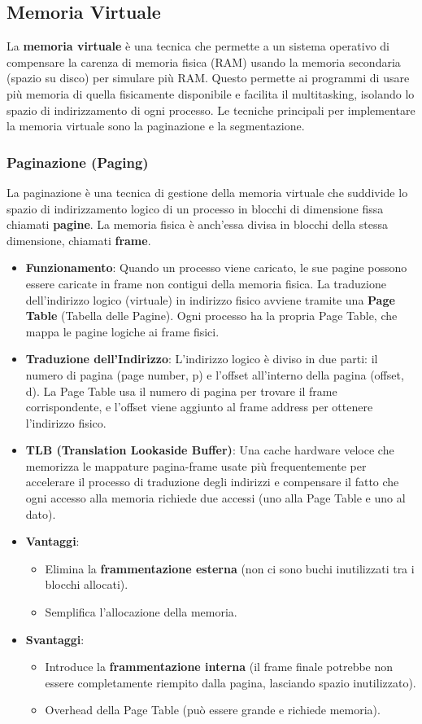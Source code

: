\subsection{Memoria Virtuale}
La \textbf{memoria virtuale} è una tecnica che permette a un sistema operativo di compensare la carenza di memoria fisica (RAM) usando la memoria secondaria (spazio su disco) per simulare più RAM. Questo permette ai programmi di usare più memoria di quella fisicamente disponibile e facilita il multitasking, isolando lo spazio di indirizzamento di ogni processo. Le tecniche principali per implementare la memoria virtuale sono la paginazione e la segmentazione.

\subsubsection{Paginazione (Paging)}
La paginazione è una tecnica di gestione della memoria virtuale che suddivide lo spazio di indirizzamento logico di un processo in blocchi di dimensione fissa chiamati \textbf{pagine}. La memoria fisica è anch'essa divisa in blocchi della stessa dimensione, chiamati \textbf{frame}.
\begin{itemize}
    \item \textbf{Funzionamento}: Quando un processo viene caricato, le sue pagine possono essere caricate in frame non contigui della memoria fisica. La traduzione dell'indirizzo logico (virtuale) in indirizzo fisico avviene tramite una \textbf{Page Table} (Tabella delle Pagine). Ogni processo ha la propria Page Table, che mappa le pagine logiche ai frame fisici.
    \item \textbf{Traduzione dell'Indirizzo}: L'indirizzo logico è diviso in due parti: il numero di pagina (page number, p) e l'offset all'interno della pagina (offset, d). La Page Table usa il numero di pagina per trovare il frame corrispondente, e l'offset viene aggiunto al frame address per ottenere l'indirizzo fisico.
    \item \textbf{TLB (Translation Lookaside Buffer)}: Una cache hardware veloce che memorizza le mappature pagina-frame usate più frequentemente per accelerare il processo di traduzione degli indirizzi e compensare il fatto che ogni accesso alla memoria richiede due accessi (uno alla Page Table e uno al dato).
    \item \textbf{Vantaggi}:
    \begin{itemize}
        \item Elimina la \textbf{frammentazione esterna} (non ci sono buchi inutilizzati tra i blocchi allocati).
        \item Semplifica l'allocazione della memoria.
    \end{itemize}
    \item \textbf{Svantaggi}:
    \begin{itemize}
        \item Introduce la \textbf{frammentazione interna} (il frame finale potrebbe non essere completamente riempito dalla pagina, lasciando spazio inutilizzato).
        \item Overhead della Page Table (può essere grande e richiede memoria).
    \end{itemize}
\end{itemize}

